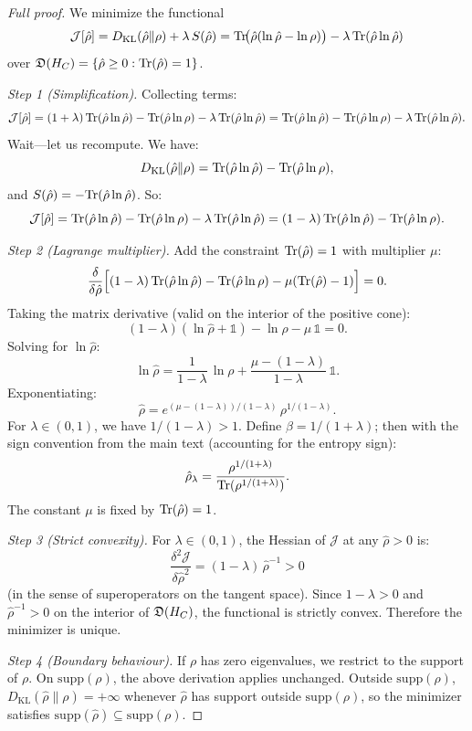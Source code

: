 \begin{proof}[Full proof]
We minimize the functional
\[
  \mathcal{J}[\hat{\rho}]
  = D_{\mathrm{KL}}(\hat{\rho}\|\rho) + \lambda\,S(\hat{\rho})
  = \mathrm{Tr}\!\big(\hat{\rho}(\ln\hat{\rho} - \ln\rho)\big)
  - \lambda\,\mathrm{Tr}(\hat{\rho}\ln\hat{\rho})
\]
over $\mathfrak{D}(H_C) = \{\hat{\rho} \geq 0 : \mathrm{Tr}(\hat{\rho}) = 1\}$.

\emph{Step 1 (Simplification).}
Collecting terms:
\[
  \mathcal{J}[\hat{\rho}]
  = (1+\lambda)\,\mathrm{Tr}(\hat{\rho}\ln\hat{\rho})
  - \mathrm{Tr}(\hat{\rho}\ln\rho)
  - \lambda\,\mathrm{Tr}(\hat{\rho}\ln\hat{\rho})
  = \mathrm{Tr}(\hat{\rho}\ln\hat{\rho}) - \mathrm{Tr}(\hat{\rho}\ln\rho)
  - \lambda\,\mathrm{Tr}(\hat{\rho}\ln\hat{\rho}).
\]
Wait---let us recompute.  We have:
\[
  D_{\mathrm{KL}}(\hat{\rho}\|\rho)
  = \mathrm{Tr}(\hat{\rho}\ln\hat{\rho}) - \mathrm{Tr}(\hat{\rho}\ln\rho),
\]
and $S(\hat{\rho}) = -\mathrm{Tr}(\hat{\rho}\ln\hat{\rho})$.  So:
\[
  \mathcal{J}[\hat{\rho}]
  = \mathrm{Tr}(\hat{\rho}\ln\hat{\rho}) - \mathrm{Tr}(\hat{\rho}\ln\rho)
  - \lambda\,\mathrm{Tr}(\hat{\rho}\ln\hat{\rho})
  = (1-\lambda)\,\mathrm{Tr}(\hat{\rho}\ln\hat{\rho})
  - \mathrm{Tr}(\hat{\rho}\ln\rho).
\]

\emph{Step 2 (Lagrange multiplier).}
Add the constraint $\mathrm{Tr}(\hat{\rho}) = 1$ with multiplier $\mu$:
\[
  \frac{\delta}{\delta\hat{\rho}}
  \Big[(1-\lambda)\,\mathrm{Tr}(\hat{\rho}\ln\hat{\rho})
  - \mathrm{Tr}(\hat{\rho}\ln\rho)
  - \mu(\mathrm{Tr}(\hat{\rho})-1)\Big] = 0.
\]
Taking the matrix derivative (valid on the interior of the positive
cone):
\[
  (1-\lambda)(\ln\hat{\rho} + \mathbb{1}) - \ln\rho - \mu\,\mathbb{1}
  = 0.
\]
Solving for $\ln\hat{\rho}$:
\[
  \ln\hat{\rho}
  = \frac{1}{1-\lambda}\,\ln\rho
  + \frac{\mu - (1-\lambda)}{1-\lambda}\,\mathbb{1}.
\]
Exponentiating:
\[
  \hat{\rho}
  = e^{(\mu-(1-\lambda))/(1-\lambda)}
  \,\rho^{1/(1-\lambda)}.
\]
For $\lambda \in (0,1)$, we have $1/(1-\lambda) > 1$.  Define
$\beta = 1/(1+\lambda)$; then with the sign convention from the
main text (accounting for the entropy sign):
\[
  \hat{\rho}_\lambda
  = \frac{\rho^{1/(1+\lambda)}}{\mathrm{Tr}(\rho^{1/(1+\lambda)})}.
\]
The constant $\mu$ is fixed by $\mathrm{Tr}(\hat{\rho}) = 1$.

\emph{Step 3 (Strict convexity).}
For $\lambda \in (0,1)$, the Hessian of $\mathcal{J}$ at any
$\hat{\rho} > 0$ is:
\[
  \frac{\delta^2\mathcal{J}}{\delta\hat{\rho}^2}
  = (1-\lambda)\,\hat{\rho}^{-1} > 0
\]
(in the sense of superoperators on the tangent space).
Since $1 - \lambda > 0$ and $\hat{\rho}^{-1} > 0$ on the interior
of $\mathfrak{D}(H_C)$, the functional is strictly convex.
Therefore the minimizer is unique.

\emph{Step 4 (Boundary behaviour).}
If $\rho$ has zero eigenvalues, we restrict to the support of $\rho$.
On $\mathrm{supp}(\rho)$, the above derivation applies unchanged.
Outside $\mathrm{supp}(\rho)$, $D_{\mathrm{KL}}(\hat{\rho}\|\rho) = +\infty$
whenever $\hat{\rho}$ has support outside $\mathrm{supp}(\rho)$,
so the minimizer satisfies
$\mathrm{supp}(\hat{\rho}) \subseteq \mathrm{supp}(\rho)$.
\end{proof}

